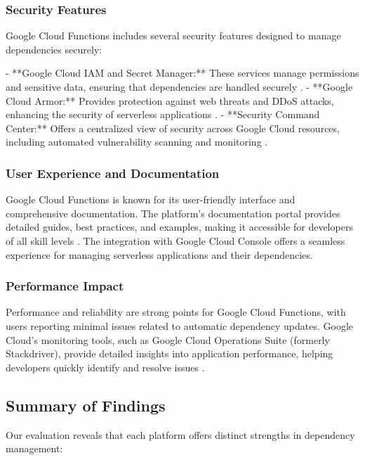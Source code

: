 \documentclass[sigconf]{acmart}
\begin{document}
\subsubsection{Security Features}

Google Cloud Functions includes several security features designed to manage dependencies securely:

- **Google Cloud IAM and Secret Manager:** These services manage permissions and sensitive data, ensuring that dependencies are handled securely \cite{googleSecurity2023}.
- **Google Cloud Armor:** Provides protection against web threats and DDoS attacks, enhancing the security of serverless applications \cite{googleArmor2023}.
- **Security Command Center:** Offers a centralized view of security across Google Cloud resources, including automated vulnerability scanning and monitoring \cite{googleSCC2023}.

\subsubsection{User Experience and Documentation}

Google Cloud Functions is known for its user-friendly interface and comprehensive documentation. The platform's documentation portal provides detailed guides, best practices, and examples, making it accessible for developers of all skill levels \cite{googleDocs2023}. The integration with Google Cloud Console offers a seamless experience for managing serverless applications and their dependencies.

\subsubsection{Performance Impact}

Performance and reliability are strong points for Google Cloud Functions, with users reporting minimal issues related to automatic dependency updates. Google Cloud's monitoring tools, such as Google Cloud Operations Suite (formerly Stackdriver), provide detailed insights into application performance, helping developers quickly identify and resolve issues \cite{googlePerformance2023}.

\subsection{Summary of Findings}

Our evaluation reveals that each platform offers distinct strengths in dependency management:
\end{document}
